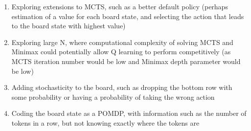 \documentclass[12pt]{article}
\begin{document}
\begin{enumerate}
\item Exploring extensions to MCTS, such as a better default policy (perhaps estimation of a value for each board state, and selecting the action that leads to the board state with highest value)
\item Exploring large N, where computational complexity of solving MCTS and Minimax could potentially allow Q learning to perform competitively (as MCTS iteration number would be low and Minimax depth parameter would be low)
\item Adding stochasticity to the board, such as dropping the bottom row with some probability or having a probability of taking the wrong action
\item Coding the board state as a POMDP, with information such as the number of tokens in a row, but not knowing exactly where the tokens are 
\end{enumerate}
\end{document}
